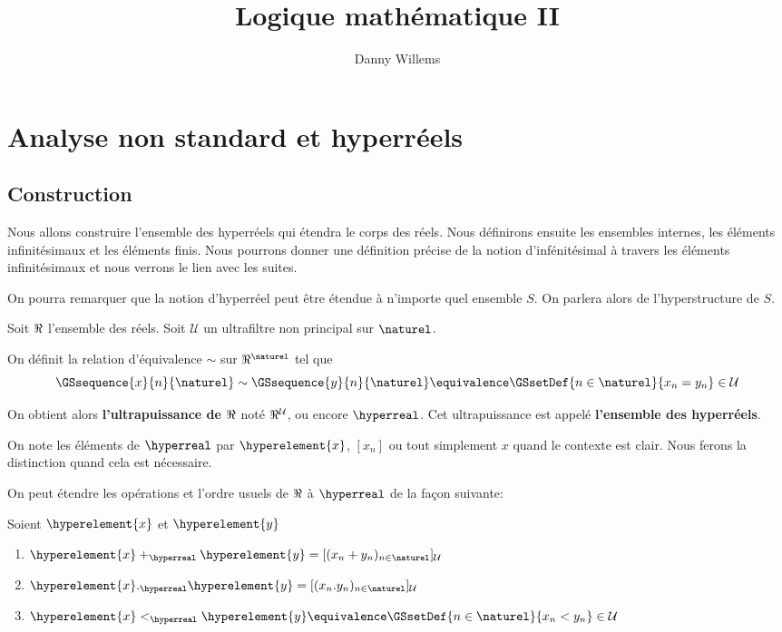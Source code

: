 \documentclass[a4paper, 12pt]{report}
\title{Logique mathématique II}
\author{Danny Willems}
\begin{document}
\maketitle

\tableofcontents

\chapter{Analyse non standard et hyperréels}

\section{Construction}

Nous allons construire l'ensemble des hyperréels qui étendra le corps des réels.
Nous définirons ensuite les ensembles internes, les éléments infinitésimaux et
les éléments finis. Nous pourrons donner une définition précise de la notion
d'infénitésimal à travers les éléments infinitésimaux et nous verrons le lien
avec les suites.

On pourra remarquer que la notion d'hyperréel peut être étendue à n'importe quel
ensemble $S$. On parlera alors de l'hyperstructure de $S$.

Soit $\real$ l'ensemble des réels. Soit $\mathcal{U}$ un ultrafiltre non
principal sur $\naturel$.

On définit la relation d'équivalence $\sim$ sur $\real^{\naturel}$ tel que
\begin{equation}
	\GSsequence{x}{n}{\naturel} \sim \GSsequence{y}{n}{\naturel} \equivalence \GSsetDef{n \in \naturel}{x_{n} = y_{n}} \in \mathcal{U}
\end{equation}

On obtient alors \textbf{l'ultrapuissance de $\real$} noté $\real^{\mathcal{U}}$,
ou encore $\hyperreal$. Cet ultrapuissance est appelé \textbf{l'ensemble des
hyperréels}.

On note les éléments de $\hyperreal$ par $\hyperelement{x}$,
$[x_{n}]$ ou tout simplement $x$ quand le contexte est clair. Nous ferons la
distinction quand cela est nécessaire.

On peut étendre les opérations et l'ordre usuels de $\real$ à $\hyperreal$ de la façon
suivante:

Soient $\hyperelement{x}$ et $\hyperelement{y}$
\begin{enumerate}
	\item $\hyperelement{x} +_{\hyperreal} \hyperelement{y} = [(x_{n} +
		y_{n})_{n \in \naturel}]_{\mathcal{U}}$
	\item $\hyperelement{x} ._{\hyperreal} \hyperelement{y} = [(x_{n} .
		y_{n})_{n \in \naturel}]_{\mathcal{U}}$
	\item $\hyperelement{x} <_{\hyperreal} \hyperelement{y} \equivalence
		\GSsetDef{n \in \naturel}{x_{n} < y_{n}} \in \mathcal{U}$
\end{enumerate}
\end{document}
